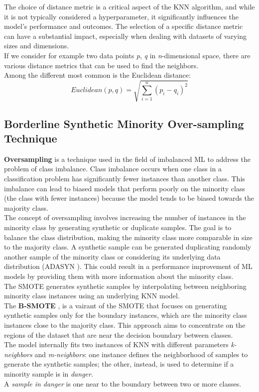 The choice of distance metric is a critical aspect of the KNN algorithm, and while it is not typically considered a hyperparameter, it significantly influences the model's performance and outcomes. 
The selection of a specific distance metric can have a substantial impact, especially when dealing with datasets of varying sizes and dimensions. \\
If we consider for example two data points \textit{p}, \textit{q} in \textit{n}-dimensional space, there are various distance metrics that can be used to find the neighbors.\\
Among the different  most common is the Euclidean distance: 
\begin{equation}
    Euclidean(p,q) = \sqrt{\sum_{i=1}^{n} (p_i - q_i)^2}
    \label{formula:distance}
\end{equation}

\subsection{Borderline Synthetic Minority Over-sampling Technique}
\label{subsec:borderline}

\textbf{Oversampling} is a technique used in the field of imbalanced ML to address the problem of class imbalance. 
Class imbalance occurs when one class in a classification problem has significantly fewer instances than another class. 
This imbalance can lead to biased models that perform poorly on the minority class (the class with fewer instances) because the model tends to be biased towards the majority class.\\
The concept of oversampling involves increasing the number of instances in the minority class by generating synthetic or duplicate samples. 
The goal is to balance the class distribution, making the minority class more comparable in size to the majority class. 
A synthetic sample can be generated duplicating randomly another sample of the minority class or considering its underlying data distribution (ADASYN \cite{adasyn:2008}).
This could result in a performance improvement of ML models by providing them with more information about the minority class.\\
The SMOTE generates synthetic samples by interpolating between neighboring minority class instances using an underlying KNN model.\\

The \textbf{B-SMOTE} \cite{Han2005BorderlineSMOTEAN:2005}, is a vairant of the SMOTE that focuses on generating synthetic samples only for the boundary instances, which are the minority class instances close to the majority class. 
This approach aims to concentrate on the regions of the dataset that are near the decision boundary between classes. \\
The model internally fits two instances of KNN with different parameters \textit{k-neighbors} and \textit{m-neighbors}: one instance defines the neighborhood of samples to generate the synthetic samples; the other, instead, is used to determine if a minority sample is in \textit{danger}.\\
A \textit{sample in danger} is one near to the boundary between two or more classes.

